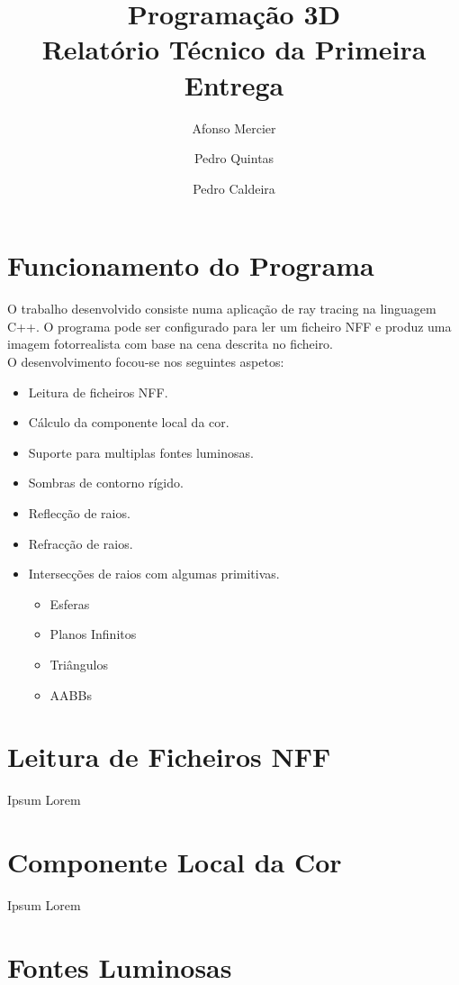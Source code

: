 \documentclass[twocolumn]{article}
\title{
    \textbf{Programação 3D} \\
    Relatório Técnico da Primeira Entrega
}
\author{Afonso Mercier \and Pedro Quintas \and Pedro Caldeira}
\date{}
\begin{document}
    \maketitle

    \section{Funcionamento do Programa}

    O trabalho desenvolvido consiste numa aplicação de ray tracing na linguagem
    C++. O programa pode ser configurado para ler um ficheiro NFF e produz uma
    imagem fotorrealista com base na cena descrita no ficheiro. \\
    O desenvolvimento focou-se nos seguintes aspetos:

    \begin{itemize}
        \item Leitura de ficheiros NFF.
        \item Cálculo da componente local da cor.
        \item Suporte para multiplas fontes luminosas.
        \item Sombras de contorno rígido.
        \item Reflecção de raios.
        \item Refracção de raios.
        \item Intersecções de raios com algumas primitivas.
        \begin{itemize}
            \item Esferas
            \item Planos Infinitos
            \item Triângulos
            \item AABBs
        \end{itemize}
    \end{itemize}

    \section{Leitura de Ficheiros NFF}
    
    Ipsum Lorem

    \section{Componente Local da Cor}

    Ipsum Lorem

    \section{Fontes Luminosas}
\end{document}
